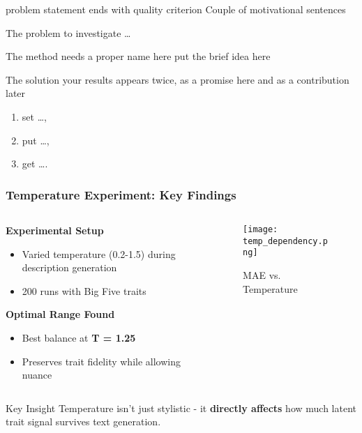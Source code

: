 \documentclass[12pt,pdf,hyperref={unicode}]{beamer}
\begin{document}
\begin{frame}{problem statement ends with quality criterion}
Couple of motivational sentences
\begin{block}{The problem}
to investigate \ldots 
\end{block}
\begin{block}{The method needs a proper name here}
put the brief idea here
\end{block}
\begin{block}{The solution} your results appears twice, as a promise here and as a contribution later
\begin{enumerate}[1)]
\item set \ldots,
\item put \ldots,
\item get \ldots.
\end{enumerate}
\end{block}
\end{frame}


\begin{frame}
\frametitle{Temperature Experiment: Key Findings}

\begin{columns}
\begin{column}{0.5\textwidth}
\textbf{Experimental Setup}
\begin{itemize}
    \item Varied temperature (0.2-1.5) during description generation
    \item 200 runs with Big Five traits
\end{itemize}

\vspace{0.3cm}
\textbf{Optimal Range Found}
\begin{itemize}
    \item Best balance at \textbf{T = 1.25}
    \item Preserves trait fidelity while allowing nuance
\end{itemize}
\end{column}

\begin{column}{0.7\textwidth}
\begin{figure}
\texttt{[image: temp\_dependency.png]}
\caption{MAE vs. Temperature}
\end{figure}
\end{column}
\end{columns}

\begin{alertblock}{Key Insight}
Temperature isn't just stylistic - it \textbf{directly affects} how much latent trait signal survives text generation.
\end{alertblock}
\end{frame}
\end{document}
